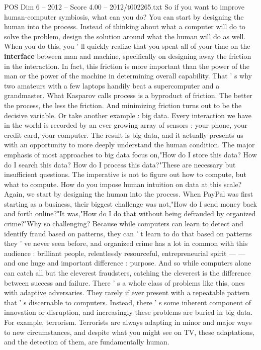 \begin{textsample}{POS Dim 6 – 2012 – Score 4.00 – 2012/t002265.txt}
So if you want to improve human-computer symbiosis, what can you do?
You can start by designing the human into the process.
Instead of thinking about what a computer will do to solve the problem, design the solution around what the human will do as well.
When you do this, you ' ll quickly realize that you spent all of your time on the \textbf{interface} between man and machine, specifically on designing away the friction in the interaction.
In fact, this friction is more important than the power of the man or the power of the machine in determining overall capability.
That ' s why two amateurs with a few laptops handily beat a supercomputer and a grandmaster.
What Kasparov calls process is a byproduct of friction.
The better the process, the less the friction.
And minimizing friction turns out to be the decisive variable.
Or take another example : big data.
Every interaction we have in the world is recorded by an ever growing array of sensors : your phone, your credit card, your computer.
The result is big data, and it actually presents us with an opportunity to more deeply understand the human condition.
The major emphasis of most approaches to big data focus on,"How do I store this data?
How do I search this data?
How do I process this data?"These are necessary but insufficient questions.
The imperative is not to figure out how to compute, but what to compute.
How do you impose human intuition on data at this scale?
Again, we start by designing the human into the process.
When PayPal was first starting as a business, their biggest challenge was not,"How do I send money back and forth online?"It was,"How do I do that without being defrauded by organized crime?"Why so challenging?
Because while computers can learn to detect and identify fraud based on patterns, they can ' t learn to do that based on patterns they ' ve never seen before, and organized crime has a lot in common with this audience : brilliant people, relentlessly resourceful, entrepreneurial spirit — — and one huge and important difference : purpose.
And so while computers alone can catch all but the cleverest fraudsters, catching the cleverest is the difference between success and failure.
There ' s a whole class of problems like this, ones with adaptive adversaries.
They rarely if ever present with a repeatable pattern that ' s discernable to computers.
Instead, there ' s some inherent component of innovation or disruption, and increasingly these problems are buried in big data.
For example, terrorism.
Terrorists are always adapting in minor and major ways to new circumstances, and despite what you might see on TV, these adaptations, and the detection of them, are fundamentally human.

\end{textsample}
